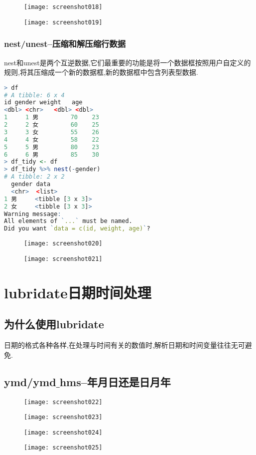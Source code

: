 \documentclass[11pt,a4paper,oneside]{book}
\begin{document}
\begin{figure}[H]
	\centering
	\texttt{[image: screenshot018]}
\end{figure}
\begin{figure}[H]
	\centering
	\texttt{[image: screenshot019]}
\end{figure}

\subsubsection{nest/unest--压缩和解压缩行数据}
nest和unest是两个互逆数据,它们最重要的功能是将一个数据框按照用户自定义的规则,将其压缩成一个新的数据框,新的数据框中包含列表型数据.
\begin{lstlisting}[language=r]
> df
# A tibble: 6 x 4
id gender weight   age
<dbl> <chr>   <dbl> <dbl>
1     1 男         70    23
2     2 女         60    25
3     3 女         55    26
4     4 女         58    22
5     5 男         80    23
6     6 男         85    30
> df_tidy <- df
> df_tidy %>% nest(-gender)
# A tibble: 2 x 2
  gender data            
  <chr>  <list>          
1 男     <tibble [3 x 3]>
2 女     <tibble [3 x 3]>
Warning message:
All elements of `...` must be named.
Did you want `data = c(id, weight, age)`? 
\end{lstlisting}
\begin{figure}[H]
	\centering
	\texttt{[image: screenshot020]}
\end{figure}
\begin{figure}[H]
	\centering
	\texttt{[image: screenshot021]}
\end{figure}

\section{lubridate日期时间处理}
\subsection{为什么使用lubridate}
日期的格式各种各样,在处理与时间有关的数值时,解析日期和时间变量往往无可避免.

\subsection{ymd/ymd$ \_ $hms--年月日还是日月年}
\begin{figure}[H]
	\centering
	\texttt{[image: screenshot022]}
\end{figure}
\begin{figure}[H]
	\centering
	\texttt{[image: screenshot023]}
\end{figure}
\begin{figure}[H]
	\centering
	\texttt{[image: screenshot024]}
\end{figure}
\begin{figure}[H]
	\centering
	\texttt{[image: screenshot025]}
\end{figure}
\end{document}

